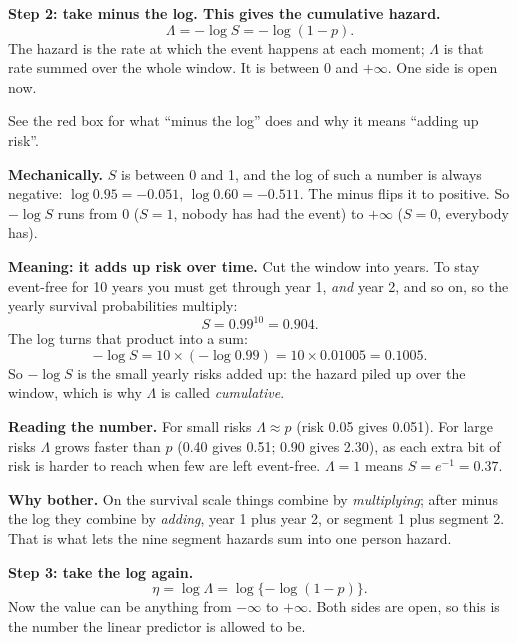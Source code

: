 \documentclass[11pt]{article}
\begin{document}
\noindent
\begin{minipage}[t]{0.38\textwidth}
\textbf{Step 2: take minus the log. This gives the cumulative hazard.}
\[
  \Lambda = -\log S = -\log(1 - p).
\]
The hazard is the rate at which the event happens at each moment; $\Lambda$ is that rate summed
over the whole window. It is between 0 and $+\infty$. One side is open now.

\medskip
See the red box for what ``minus the log'' does and why it means ``adding up risk''.
\end{minipage}\hfill
\begin{minipage}[t]{0.60\textwidth}
\vspace{-1.2em}
\begin{tcolorbox}[colback=red!4,colframe=red!70!black,boxrule=0.8pt,arc=2pt,
  left=5pt,right=5pt,top=4pt,bottom=4pt,fontupper=\footnotesize,
  title={\small What does ``take minus the log'' do?},fonttitle=\bfseries]
\textbf{Mechanically.} $S$ is between 0 and 1, and the log of such a number is always
negative: $\log 0.95 = -0.051$, $\log 0.60 = -0.511$. The minus flips it to positive. So
$-\log S$ runs from 0 ($S=1$, nobody has had the event) to $+\infty$ ($S=0$, everybody has).

\smallskip
\textbf{Meaning: it adds up risk over time.} Cut the window into years. To stay event-free for
10 years you must get through year 1, \emph{and} year 2, and so on, so the yearly survival
probabilities multiply:
\[
  S = 0.99^{10} = 0.904 .
\]
The log turns that product into a sum:
\[
  -\log S = 10 \times (-\log 0.99) = 10 \times 0.01005 = 0.1005 .
\]
So $-\log S$ is the small yearly risks added up: the hazard piled up over the window, which is
why $\Lambda$ is called \emph{cumulative}.

\smallskip
\textbf{Reading the number.} For small risks $\Lambda \approx p$ (risk 0.05 gives 0.051). For
large risks $\Lambda$ grows faster than $p$ (0.40 gives 0.51; 0.90 gives 2.30), as each extra
bit of risk is harder to reach when few are left event-free. $\Lambda = 1$ means
$S = e^{-1} = 0.37$.

\smallskip
\textbf{Why bother.} On the survival scale things combine by \emph{multiplying}; after minus
the log they combine by \emph{adding}, year 1 plus year 2, or segment 1 plus segment 2. That
is what lets the nine segment hazards sum into one person hazard.
\end{tcolorbox}
\end{minipage}
\medskip

\textbf{Step 3: take the log again.}
\[
  \eta = \log \Lambda = \log\{-\log(1-p)\}.
\]
Now the value can be anything from $-\infty$ to $+\infty$. Both sides are open, so this is the
number the linear predictor is allowed to be.
\end{document}
